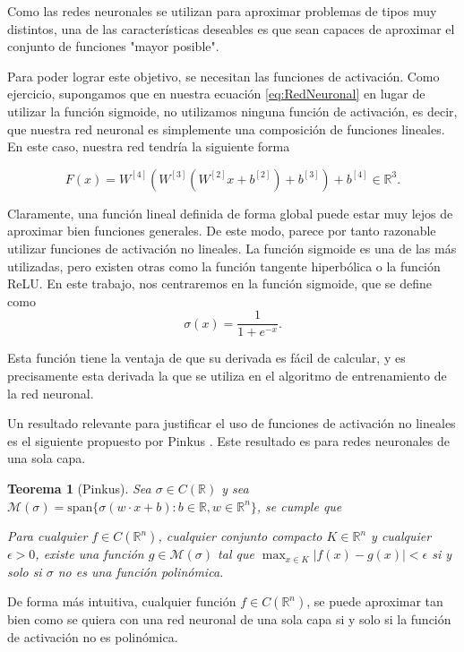 \documentclass[a4paper,11pt,spanish, twoside, leqno]{tfg-uam}
\newtheorem{teor}{Teorema}[chapter]
\theoremstyle{definition}
\begin{document}
Como las redes neuronales se utilizan para aproximar problemas de tipos muy distintos, una de las características deseables es que sean  capaces de aproximar el conjunto de funciones "mayor posible".

Para poder lograr este objetivo, se necesitan las funciones de activación. Como ejercicio, supongamos que en nuestra ecuación \eqref{eq:RedNeuronal} en lugar de utilizar la función sigmoide, no utilizamos ninguna función de activación, es decir, que nuestra red neuronal es simplemente una composición de funciones lineales. En este caso, nuestra red tendría la siguiente forma

\begin{equation*}
    F(x)=W^{[4]}(W^{[3]}(W^{[2]}x+b^{[2]})+b^{[3]})+b^{[4]}\in\mathbb{R}^3.
\end{equation*}

Claramente, una función lineal definida de forma global puede estar muy lejos de aproximar bien funciones generales. De este modo, parece por tanto razonable utilizar funciones de activación no lineales. La función sigmoide es una de las más utilizadas, pero existen otras como la función tangente hiperbólica o la función ReLU. En este trabajo, nos centraremos en la función sigmoide, que se define como
\begin{equation*}
    \sigma(x)=\frac{1}{1+e^{-x}}.
\end{equation*}

Esta función tiene la ventaja de que su derivada es fácil de calcular, y es precisamente esta derivada la que se utiliza en el algoritmo de entrenamiento de la red neuronal.

Un resultado relevante para justificar el uso de funciones de activación no lineales es el siguiente propuesto por Pinkus \cite[Theorem 3.1]{pinkus1999approximation}. Este resultado es para redes neuronales de una sola capa.

\begin{teor}[Pinkus]
    Sea $\sigma\in C(\mathbb{R})$ y sea $\mathcal{M}(\sigma) = \text{span}\{\sigma(w\cdot x + b): b \in \mathbb{R}, w \in \mathbb{R}^n\}$, se cumple que
    
    Para cualquier $f \in C(\mathbb{R}^n)$, cualquier conjunto compacto $K\in \mathbb{R}^n$ y cualquier $\epsilon > 0$, existe una función $g\in \mathcal{M}(\sigma)$ tal que $\max_{x\in K}|f(x)-g(x)|<\epsilon$ si y solo si $\sigma$ no es una función polinómica.
\end{teor}
De forma más intuitiva, cualquier función $f \in C(\mathbb{R}^n)$, se puede aproximar tan bien como se quiera con una red neuronal de una sola capa si y solo si la función de activación no es polinómica.
\end{document}
